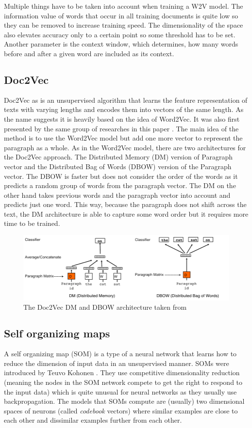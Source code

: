 Multiple things have to be taken into account when training a W2V model. The information value of words that occur in all training documents is quite low so they can be removed to increase training speed. The dimensionality of the space also elevates accuracy only to a certain point so some threshold has to be set. Another parameter is the context window, which determines, how many words before and after a given word are included as its context.

\subsection{Doc2Vec}
Doc2Vec as is an unsupervised algorithm that learns the feature representation of texts with varying lengths and encodes them into vectors of the same length. As the name suggests it is heavily based on the idea of Word2Vec. It was also first presented by the same group of researches in this paper \cite{DBLP:journals/corr/LeM14}. The main idea of the method is to use the Word2Vec model but add one more vector to represent the paragraph as a whole. As in the Word2Vec model, there are two architectures for the Doc2Vec approach. The Distributed Memory (DM) version of Paragraph vector and the Distributed Bag of Words (DBOW) version of the Paragraph vector. The DBOW is faster but does not consider the order of the words as it predicts a random group of words from the paragraph vector. The DM on the other hand takes previous words and the paragraph vector into account and predicts just one word. This way, because the paragraph does not shift across the text, the DM architecture is able to capture some word order but it requires more time to be trained.
\begin{figure}[h]
    \centering
	\includegraphics[width=140mm]{./img/DV_DBOW_doc2vec_architectures.png}
	\caption{The Doc2Vec DM and DBOW architecture taken from \cite{DBLP:journals/corr/LeM14}}
	\label{fig:dbow_dm_d2v_architecture}
\end{figure}
\subsection{Self organizing maps}
A self organizing map (SOM) is a type of a neural network that learns how to reduce the dimension of input data in an unsupervised manner. SOMs were introduced by Teuvo Kohonen \cite{Kohonen1982}. They use competitive dimensionality reduction (meaning the nodes in the SOM network compete to get the right to respond to the input data) which is quite unusual for neural networks as they usually use backpropagation. The models that SOMs compute are (usually) two dimensional spaces of neurons (called \textit{codebook} vectors) where similar examples are close to each other and dissimilar examples further from each other.

